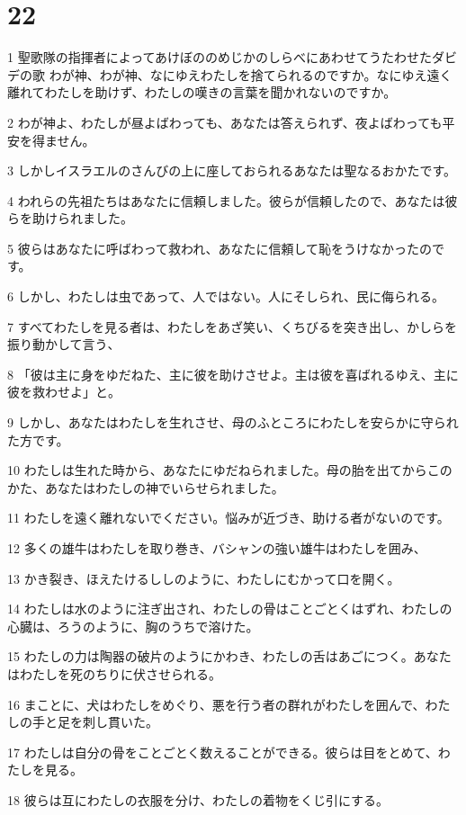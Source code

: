 \chapter{22}

\par 1 聖歌隊の指揮者によってあけぼののめじかのしらべにあわせてうたわせたダビデの歌 わが神、わが神、なにゆえわたしを捨てられるのですか。なにゆえ遠く離れてわたしを助けず、わたしの嘆きの言葉を聞かれないのですか。
\par 2 わが神よ、わたしが昼よばわっても、あなたは答えられず、夜よばわっても平安を得ません。
\par 3 しかしイスラエルのさんびの上に座しておられるあなたは聖なるおかたです。
\par 4 われらの先祖たちはあなたに信頼しました。彼らが信頼したので、あなたは彼らを助けられました。
\par 5 彼らはあなたに呼ばわって救われ、あなたに信頼して恥をうけなかったのです。
\par 6 しかし、わたしは虫であって、人ではない。人にそしられ、民に侮られる。
\par 7 すべてわたしを見る者は、わたしをあざ笑い、くちびるを突き出し、かしらを振り動かして言う、
\par 8 「彼は主に身をゆだねた、主に彼を助けさせよ。主は彼を喜ばれるゆえ、主に彼を救わせよ」と。
\par 9 しかし、あなたはわたしを生れさせ、母のふところにわたしを安らかに守られた方です。
\par 10 わたしは生れた時から、あなたにゆだねられました。母の胎を出てからこのかた、あなたはわたしの神でいらせられました。
\par 11 わたしを遠く離れないでください。悩みが近づき、助ける者がないのです。
\par 12 多くの雄牛はわたしを取り巻き、バシャンの強い雄牛はわたしを囲み、
\par 13 かき裂き、ほえたけるししのように、わたしにむかって口を開く。
\par 14 わたしは水のように注ぎ出され、わたしの骨はことごとくはずれ、わたしの心臓は、ろうのように、胸のうちで溶けた。
\par 15 わたしの力は陶器の破片のようにかわき、わたしの舌はあごにつく。あなたはわたしを死のちりに伏させられる。
\par 16 まことに、犬はわたしをめぐり、悪を行う者の群れがわたしを囲んで、わたしの手と足を刺し貫いた。
\par 17 わたしは自分の骨をことごとく数えることができる。彼らは目をとめて、わたしを見る。
\par 18 彼らは互にわたしの衣服を分け、わたしの着物をくじ引にする。
